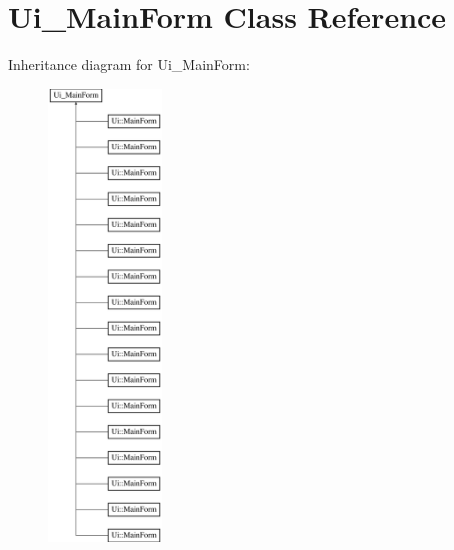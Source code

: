 \hypertarget{class_ui___main_form}{}\section{Ui\+\_\+\+Main\+Form Class Reference}
\label{class_ui___main_form}
Inheritance diagram for Ui\+\_\+\+Main\+Form\+:\begin{figure}[H]
\begin{center}
\leavevmode
\includegraphics[height=12.000000cm]{class_ui___main_form}
\end{center}
\end{figure}
